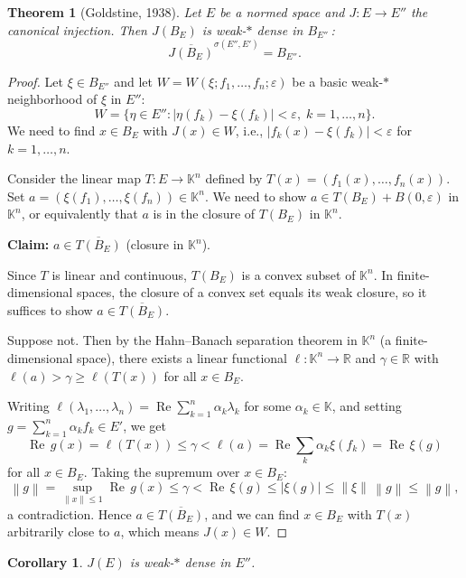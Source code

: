 \documentclass[a4paper,12pt]{book}
\newcommand{\R}{\mathbb{R}}
\newcommand{\K}{\mathbb{K}}
\newcommand{\norm}[1]{\left\| #1 \right\|}
\theoremstyle{definition}
\theoremstyle{plain}
\newtheorem{theorem}[definition]{Theorem}
\newtheorem{corollary}[definition]{Corollary}
\theoremstyle{remark}
\begin{document}
\begin{theorem}[{Goldstine, 1938}]\label{thm:goldstine}
Let $E$ be a normed space and $J:E\to E''$ the canonical injection.  Then
$J(B_E)$ is weak-$*$ dense in $B_{E''}$\,:
\[
  \overline{J(B_E)}^{\sigma(E'',E')} = B_{E''}.
\]
\end{theorem}

\begin{proof}
Let $\xi\in B_{E''}$ and let $W = W(\xi;f_1,\ldots,f_n;\varepsilon)$ be a
basic weak-$*$ neighborhood of $\xi$ in $E''$:
\[
  W = \bigl\{\eta\in E'': |\eta(f_k)-\xi(f_k)|<\varepsilon,\;k=1,\ldots,n\bigr\}.
\]
We need to find $x\in B_E$ with $J(x)\in W$, i.e.,
$|f_k(x)-\xi(f_k)|<\varepsilon$ for $k=1,\ldots,n$.

Consider the linear map $T:E\to\K^n$ defined by $T(x)=(f_1(x),\ldots,f_n(x))$.
Set $a = (\xi(f_1),\ldots,\xi(f_n))\in\K^n$.  We need to show $a\in T(B_E) + B(0,\varepsilon)$
in $\K^n$, or equivalently that $a$ is in the closure of $T(B_E)$ in $\K^n$.

\medskip\noindent\textbf{Claim:} $a\in\overline{T(B_E)}$ (closure in $\K^n$).

Since $T$ is linear and continuous, $T(B_E)$ is a convex subset of $\K^n$.
In finite-dimensional spaces, the closure of a convex set equals its weak
closure, so it suffices to show $a\in\overline{T(B_E)}$.

Suppose not.  Then by the Hahn--Banach separation theorem in $\K^n$ (a
finite-dimensional space), there exists a linear functional $\ell:\K^n\to\R$
and $\gamma\in\R$ with $\ell(a)>\gamma\ge\ell(T(x))$ for all $x\in B_E$.

Writing $\ell(\lambda_1,\ldots,\lambda_n) = \operatorname{Re}\sum_{k=1}^n \alpha_k\lambda_k$
for some $\alpha_k\in\K$, and setting $g = \sum_{k=1}^n \alpha_k f_k\in E'$,
we get
\[
  \operatorname{Re}\,g(x) = \ell(T(x)) \le \gamma < \ell(a)
  = \operatorname{Re}\sum_k \alpha_k\xi(f_k) = \operatorname{Re}\,\xi(g)
\]
for all $x\in B_E$.  Taking the supremum over $x\in B_E$:
\[
  \norm{g} = \sup_{\norm{x}\le 1}\operatorname{Re}\,g(x) \le \gamma
  < \operatorname{Re}\,\xi(g) \le |\xi(g)| \le \norm{\xi}\,\norm{g}\le\norm{g},
\]
a contradiction.  Hence $a\in\overline{T(B_E)}$, and we can find $x\in B_E$
with $T(x)$ arbitrarily close to $a$, which means $J(x)\in W$.
\end{proof}

\begin{corollary}\label{cor:goldstine-density}
$J(E)$ is weak-$*$ dense in $E''$.
\end{corollary}
\end{document}
